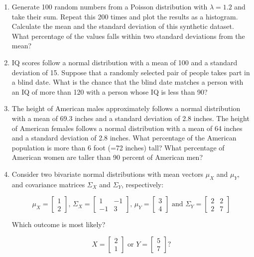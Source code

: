 \begin{enumerate}

\item Generate 100 random numbers from a Poisson distribution with
  $\lambda=1.2$ and take their sum. Repeat this 200 times and plot the
  results as a histogram. Calculate the mean and the standard
  deviation of this synthetic dataset. What percentage of the values
  falls within two standard deviations from the mean?
  
\item IQ scores follow a normal distribution with a mean of 100 and a
  standard deviation of 15. Suppose that a randomly selected pair of
  people takes part in a blind date. What is the chance that the blind
  date matches a person with an IQ of more than 120 with a person
  whose IQ is less than 90?
  
\item The height of American males approximately follows a normal
  distribution with a mean of 69.3 inches and a standard deviation of
  2.8 inches.  The height of American females follows a normal
  distribution with a mean of 64 inches and a standard deviation of
  2.8 inches. What percentage of the American population is more than
  6 foot (=72 inches) tall? What percentage of American women are
  taller than 90 percent of American men?

\item Consider two bivariate normal distributions with mean vectors
  $\mu_X$ and $\mu_Y$, and covariance matrices $\Sigma_X$ and
  $\Sigma_Y$, respectively:

  \[
  \mu_X =
  \left[
    \begin{array}{c}
      1\\
      2
    \end{array}
    \right]\mbox{,~}
  \Sigma_X =
  \left[
    \begin{array}{cc}
      1 & -1\\
      -1 & 3
    \end{array}
    \right]\mbox{,~}
  \mu_Y =
  \left[
    \begin{array}{c}
      3\\
      4
    \end{array}
    \right]\mbox{~and~}
  \Sigma_Y =
  \left[
    \begin{array}{cc}
      2 & 2\\
      2 & 7
    \end{array}
    \right]  
  \]

  Which outcome is most likely?

  \[
  X =
  \left[
    \begin{array}{c}
      2\\
      1
    \end{array}
    \right]\mbox{~or~}
  Y =
  \left[
    \begin{array}{c}
      5\\
      7
    \end{array}
    \right]\mbox{?}
  \]
  
\end{enumerate}

